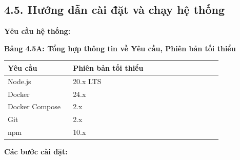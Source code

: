 \documentclass[13pt,a4paper]{extarticle}
\newcounter{none} %
\newcommand{\thesislongtableorignewline}{}
\let\thesislongtableorignewline\\
\renewcommand{\\}{\thesislongtableorignewline\hline}%
\let\\\thesislongtableorignewline
\newcommand{\thesistabletitle}[1]{%
  \begin{center}\textbf{#1}\end{center}%
}
\begin{document}
\subsection{4.5. Hướng dẫn cài đặt và chạy hệ
thống}\label{45-hux1b0ux1edbng-dux1eabn-cuxe0i-ux111ux1eb7t-vuxe0-chux1ea1y-hux1ec7-thux1ed1ng}

\textbf{Yêu cầu hệ thống:}

{\def\LTcaptype{none} %
\thesistabletitle{Bảng 4.5A: Tổng hợp thông tin về Yêu cầu, Phiên bản tối thiểu}

\begin{longtable}{|p{0.28\linewidth}|p{0.64\linewidth}|}
\hline \textbf{Yêu cầu} & \textbf{Phiên bản tối thiểu} \\
\hline
\endhead
\hline
\endlastfoot
Node.js & 20.x LTS \\
Docker & 24.x \\
Docker Compose & 2.x \\
Git & 2.x \\
npm & 10.x \\
\end{longtable}
}

\textbf{Các bước cài đặt:}
\end{document}
